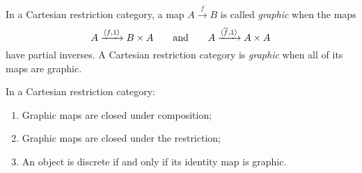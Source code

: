 \begin{definition}\label{def:graphic_map}
  In a Cartesian restriction category, a map $A\xrightarrow{f}B$ is called \emph{graphic} when the
  maps
  \[
    A\xrightarrow{\langle f,1\rangle}B\times A\qquad \text{and}\qquad
    A\xrightarrow{\langle\overline{f},1\rangle}A\times A
  \]
  have partial inverses. A Cartesian restriction category is \emph{graphic} when all of its maps
  are graphic.
\end{definition}

\begin{lemma}\label{lem:graphic_maps_are_closed_in_a_cartesian_restriction_category}
  In a Cartesian restriction category:
  \begin{enumerate}[{(}i{)}]
    \item Graphic maps are closed under composition;
    \item Graphic maps are closed under the restriction;
    \item An object is discrete if and only if its identity map is graphic.
  \end{enumerate}
\end{lemma}
